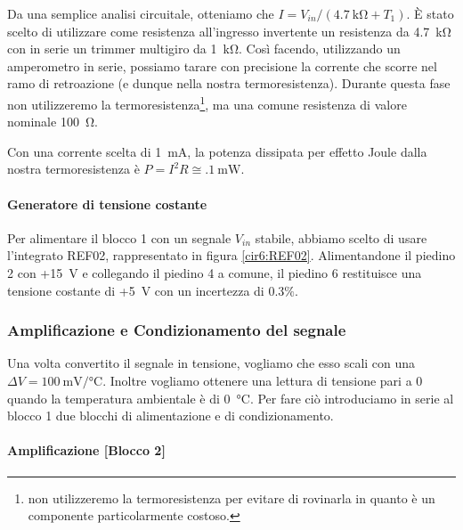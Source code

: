 Da una semplice analisi circuitale, otteniamo che $I=V_{in}/(\SI{4.7}{\kohm}+T_1)$.
È stato scelto di utilizzare come resistenza all'ingresso invertente un resistenza da \SI{4.7}{\kilo\ohm} con in serie un trimmer multigiro da \SI{1}{\kilo\ohm}.
Così facendo, utilizzando un amperometro in serie, possiamo tarare con precisione la corrente che scorre nel ramo di retroazione (e dunque nella nostra termoresistenza).
Durante questa fase non utilizzeremo la termoresistenza\footnote{non utilizzeremo la termoresistenza per evitare di rovinarla in quanto è un componente particolarmente costoso.}, ma una comune resistenza di valore nominale \SI{100}{\ohm}.

Con una corrente scelta di \SI{1}{\milli\ampere}, la potenza dissipata per effetto Joule dalla nostra termoresistenza è $P=I^2 R \cong \SI{.1}{\mW}$.
%

\paragraph{Generatore di tensione costante\newline}

Per alimentare il blocco 1 con un segnale $V_{in}$ stabile, abbiamo scelto di usare l'integrato REF02, rappresentato in figura \ref{cir6:REF02}.
Alimentandone il piedino 2 con +\SI{15}{\volt} e collegando il piedino 4 a comune, il piedino 6 restituisce una tensione costante di +\SI{5}{\volt} con un incertezza di \num{0.3}$\%$.
\newpage

\subsubsection{Amplificazione e Condizionamento del segnale}
Una volta convertito il segnale in tensione, vogliamo che esso scali con una $\Delta V=\SI{100}{\milli\volt}/\si{\celsius}$.
Inoltre vogliamo ottenere una lettura di tensione pari a \num{0} quando la temperatura ambientale è di \SI{0}{\celsius}.
Per fare ciò introduciamo in serie al blocco 1 due blocchi di alimentazione e di condizionamento.

\paragraph{Amplificazione [Blocco 2]\newline}

